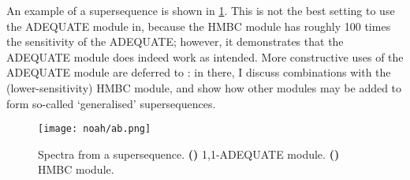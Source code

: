 An example of a  supersequence is shown in \cref{fig:noah_ab}.
This is not the best setting to use the ADEQUATE module in, because the \carbon{} HMBC module has roughly 100 times the sensitivity of the ADEQUATE; however, it demonstrates that the ADEQUATE module does indeed work as intended.
More constructive uses of the ADEQUATE module are deferred to : in there, I discuss combinations with the (lower-sensitivity) \nitrogen{} HMBC module, and show how other modules may be added to form so-called `generalised' supersequences.

\begin{figure}[htb]
    \centering
    \texttt{[image: noah/ab.png]}%
    {\label{fig:noah_ab_a}}%
    \caption[Spectra from  supersequence]{
        Spectra from a  supersequence.
        \textbf{()} 1,1-ADEQUATE module.
        \textbf{()} HMBC module.
    }
    \label{fig:noah_ab}
\end{figure}
